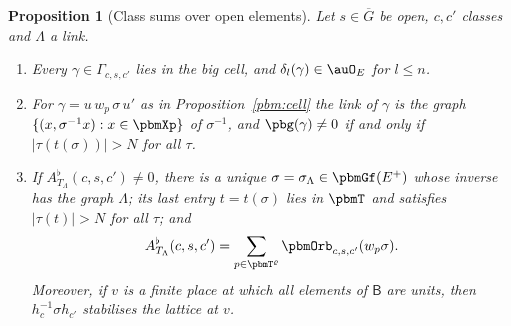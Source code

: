 \documentclass[10pt]{amsart}
\newtheorem{proposition}[theorem]{Proposition}
\theoremstyle{definition}
\theoremstyle{remark}
\providecommand{\auG}{\overline G}
\begin{document}
\begin{proposition}[Class sums over open elements]\label{pbm:classsum}
Let $s\in\auG$ be open, $c,c'$ classes and $\Lambda$ a link.
\begin{enumerate}
\item[(a)] Every $\gamma\in\Gamma_{c,s,c'}$ lies in the big cell, and $\delta_l(\gamma)\in\auO_E$ for
$l\le n$.
\item[(b)] For $\gamma=u\,w_p\,\sigma\,u'$ as in Proposition~\ref{pbm:cell} the link of $\gamma$ is
the graph $\{(x,\sigma^{-1}x):x\in\pbmXp\}$ of $\sigma^{-1}$, and $\pbg(\gamma)\ne0$ if and only if
$|\tau(t(\sigma))|>N$ for all $\tau$.
\item[(c)] If $A^\flat_{T_\Lambda}(c,s,c')\ne0$, there is a unique $\sigma=\sigma_\Lambda\in\pbmGf(E^+)$
whose inverse has the graph $\Lambda$; its last entry $t=t(\sigma)$ lies in $\pbmT$ and
satisfies $|\tau(t)|>N$ for all $\tau$; and
\[
A^\flat_{T_\Lambda}(c,s,c')=\sum_{p\in\pbmT^\varrho}\pbmOrb_{c,s,c'}(w_p\sigma).
\]
Moreover, if $v$ is a finite place at which all elements of $\mathsf B$ are units, then
$h_c^{-1}\sigma h_{c'}$ stabilises the lattice at $v$.
\end{enumerate}
\end{proposition}
\end{document}

